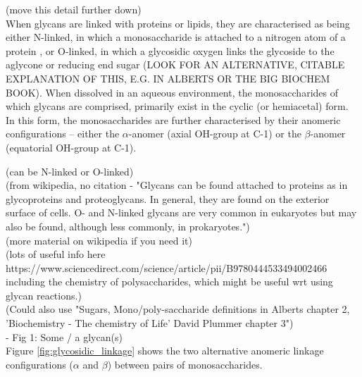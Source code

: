 \documentclass[12pt,a4paper]{article}
\begin{document}
(move this detail further down)\\
When glycans are linked with proteins or lipids, they are characterised as being either N-linked, in which a monosaccharide is attached to a nitrogen atom of a protein \citep{taylor2011introduction}, or O-linked, in which a glycosidic oxygen links the glycoside to the aglycone or reducing end sugar (LOOK FOR AN ALTERNATIVE, CITABLE EXPLANATION OF THIS, E.G. IN ALBERTS OR THE BIG BIOCHEM BOOK).
When dissolved in an aqueous environment, the monosaccharides of which glycans are comprised, primarily exist in the cyclic (or hemiacetal) form. In this form, the monosaccharides are further characterised by their anomeric configurations -- either the $\alpha$-anomer (axial OH-group at C-1) or the $\beta$-anomer (equatorial OH-group at C-1).


(can be N-linked or O-linked)\\
(from wikipedia, no citation - "Glycans can be found attached to proteins as in glycoproteins and proteoglycans. In general, they are found on the exterior surface of cells. O- and N-linked glycans are very common in eukaryotes but may also be found, although less commonly, in prokaryotes.")\\

(more material on wikipedia if you need it)\\
(lots of useful info here https://www.sciencedirect.com/science/article/pii/B9780444533494002466 including the chemistry of polysaccharides, which might be useful wrt using glycan reactions.)\\


(Could also use "Sugars, Mono/poly-saccharide definitions in Alberts chapter 2, 'Biochemistry - The chemistry of Life' David Plummer chapter 3")\\

- Fig 1: Some / a glycan(s)\\

Figure \ref{fig:glycosidic_linkage} shows the two alternative anomeric linkage configurations ($\alpha$ and $\beta$) between pairs of monosaccharides.\\
\end{document}
